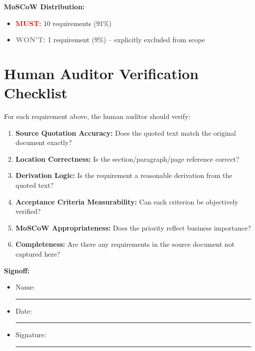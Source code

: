 \documentclass[11pt,a4paper,twoside]{report}
\begin{document}
\vspace{1em}
\textbf{MoSCoW Distribution:}
\begin{itemize}
\item \textcolor{red}{\textbf{MUST:}} 10 requirements (91\%)
\item \textcolor{gray}{\textbf{WON'T:}} 1 requirement (9\%) -- explicitly excluded from scope
\end{itemize}

\section{Human Auditor Verification Checklist}
\label{sec:req-audit-checklist}

\begin{tcolorbox}[colback=yellow!10,colframe=yellow!50!black,title=\faIcon{clipboard-check} Auditor Verification Checklist]
For each requirement above, the human auditor should verify:

\begin{enumerate}[label=\faIcon{square}]
\item \textbf{Source Quotation Accuracy:} Does the quoted text match the
original document exactly?
\item \textbf{Location Correctness:} Is the section/paragraph/page reference correct?
\item \textbf{Derivation Logic:} Is the requirement a reasonable derivation
from the quoted text?
\item \textbf{Acceptance Criteria Measurability:} Can each criterion be
objectively verified?
\item \textbf{MoSCoW Appropriateness:} Does the priority reflect business importance?
\item \textbf{Completeness:} Are there any requirements in the source document
not captured here?
\end{enumerate}

\vspace{0.5em}
\textbf{Signoff:}
\begin{itemize}
\item[] Name: \rule{6cm}{0.4pt}
\item[] Date: \rule{3cm}{0.4pt}
\item[] Signature: \rule{5cm}{0.4pt}
\end{itemize}
\end{tcolorbox}
\end{document}
